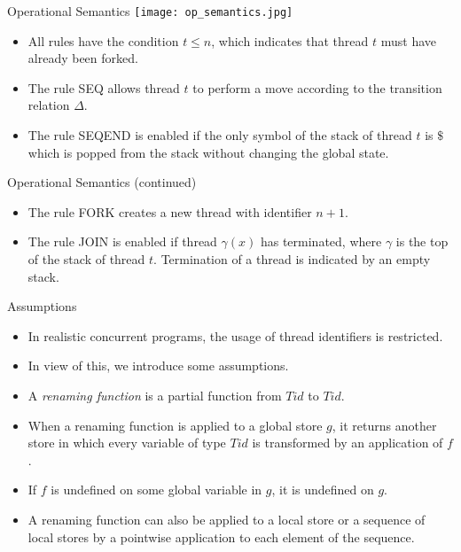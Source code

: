 \documentclass[10pt,notheorems]{beamer}
\theoremstyle{plain} %
\begin{document}
\begin{frame}{Operational Semantics}
   \texttt{[image: op\_semantics.jpg]} 
   \centering
   \begin{itemize}
    \item All rules have the condition $t\leq n$, which indicates that thread $t$ must have already been forked.
    \item The rule SEQ allows thread $t$ to perform a move according to the transition relation $\Delta$.
    \item The rule SEQEND is enabled if the only symbol of the stack of thread $t$ is $\$$ which is popped from the stack 
    without changing the global state.
\end{itemize}
\end{frame}
\begin{frame}{Operational Semantics (continued)}
    \begin{itemize}
        \item The rule FORK creates a new thread with identifier $n+1$. 
        \item The rule JOIN is enabled if thread $\gamma(x)$ has terminated, where $\gamma$ is the top of the
        stack of thread $t$. Termination of a thread is indicated by an empty stack.
    \end{itemize}
\end{frame}
\begin{frame}{Assumptions}
    \begin{itemize}
        \item In realistic concurrent programs, the usage of thread identifiers is restricted.
        \item In view of this, we introduce some assumptions. 
        \item A \textit{renaming function} is a partial function from $Tid$ to $Tid$. 
        \item When a renaming function is applied to a global store $g$, it returns another store in which 
        every variable of type $Tid$ is transformed by an application of $f$. 
        \item If $f$ is undefined on some global variable in $g$, it is undefined on $g$.
        \item A renaming function can also be applied to a local store or a sequence of local stores by a pointwise 
        application to each element of the sequence.
    \end{itemize}
\end{frame}
\end{document}
